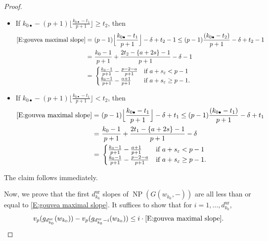 \documentclass[12pt]{amsart}
\theoremstyle{definition}
\numberwithin{equation}{subsection}
\DeclareMathOperator{\NP}{NP}
\newcommand{\unr}{\mathrm{ur}}
\begin{document}
\begin{proof}
\begin{itemize}
\item If $k_{0\bullet} - (p+1) \lfloor \frac{k_{0\bullet}-t_1}{p+1}\rfloor  \geq t_2$, then 
\begin{align*}
\eqref{E:gouvea maximal slope}
\nonumber 
=\ & (p-1)\Big\lfloor \frac{k_{0\bullet}-t_1}{p+1}\Big\rfloor -\delta + t_2-1   \leq (p-1)\frac{(k_{0\bullet}-t_2)}{p+1} -\delta +t_2 -1 \\
 =\ & \frac{k_0-1}{p+1} + \frac{2t_2-\{ a+2 s\} -1}{p+1}-\delta-1 \\ 
\nonumber
=\ & \begin{cases}
	\frac{k_0-1}{p+1}- \frac{p-2-a}{p+1} & \textrm{if } a+s_\varepsilon < p-1
	\\
	\frac{k_0-1}{p+1}- \frac{a+1}{p+1} & \textrm{if } a+s_\varepsilon \geq p-1.
\end{cases}
\end{align*}
\item If $k_{0\bullet} - (p+1) \lfloor \frac{k_{0\bullet}-t_1}{p+1}\rfloor  < t_2$, then 
\begin{align*}
\eqref{E:gouvea maximal slope} 
\nonumber
=\ & (p-1)\Big\lfloor \frac{k_{0\bullet}-t_1}{p+1}\Big\rfloor -\delta + t_1   \leq (p-1)\frac{(k_{0\bullet}-t_1)}{p+1} - \delta + t_1 \\ 
=\ &\frac{k_0-1}{p+1} + \frac{2t_1-\{ a+2 s\} -1}{p+1}-\delta \\ 
\nonumber
=\ & \begin{cases}
	\frac{k_0-1}{p+1}- \frac{a+1}{p+1}  & \textrm{if } a+s_\varepsilon < p-1
	\\
	\frac{k_0-1}{p+1}- \frac{p-2-a}{p+1}& \textrm{if } a+s_\varepsilon \geq p-1.
\end{cases}
\end{align*}
\end{itemize}
The claim follows immediately. %
 
Now, we prove that the first $d_{k_0}^\unr$ slopes of $\NP(G(w_{k_0}, -))$ are all less than or equal to \eqref{E:gouvea maximal slope}. It suffices to show that for $i = 1, \dots, d_{k_0}^\unr$,
$$
v_p(g_{d_{k_0}^\unr}(w_{k_0})) - v_p(g_{d_{k_0}^\unr-i}(w_{k_0})) \leq i \cdot \eqref{E:gouvea maximal slope}.
$$


\end{proof}
\end{document}
